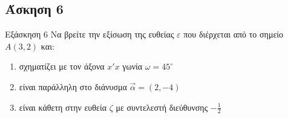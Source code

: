 \documentclass[greek]{beamer}
\begin{document}
\subsection{Άσκηση 6}
\begin{frame}[label=Άσκηση6]{Εξάσκηση 6}
 Να βρείτε την εξίσωση της ευθείας $ε$ που διέρχεται από το σημείο $Α(3,2)$ και:
 \begin{enumerate}
   \item<1-> σχηματίζει με τον άξονα $x'x$ γωνία $ω=45^{\circ}$
   \item<2-> είναι παράλληλη στο διάνυσμα $\vec{α}=(2,-4)$
   \item<3-> είναι κάθετη στην ευθεία $ζ$ με συντελεστή διεύθυνσης $-\frac{1}{2}$
 \end{enumerate}

\end{frame}
%
%
%
%
%
%
%
\end{document}
